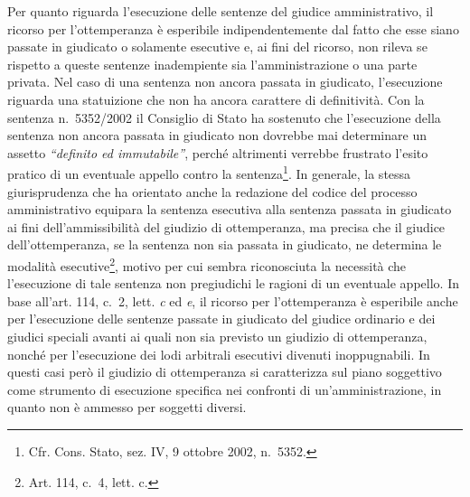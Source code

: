 \documentclass[12pt,it,a4paper,]{report}
\begin{document}
Per quanto riguarda l'esecuzione delle sentenze del giudice
amministrativo, il ricorso per l'ottemperanza è esperibile
indipendentemente dal fatto che esse siano passate in giudicato o
solamente esecutive e, ai fini del ricorso, non rileva se rispetto a
queste sentenze inadempiente sia l'amministrazione o una parte privata.
Nel caso di una sentenza non ancora passata in giudicato, l'esecuzione
riguarda una statuizione che non ha ancora carattere di definitività.
Con la sentenza n.~5352/2002 il Consiglio di Stato ha sostenuto che
l'esecuzione della sentenza non ancora passata in giudicato non dovrebbe
mai determinare un assetto \emph{``definito ed immutabile''}, perché
altrimenti verrebbe frustrato l'esito pratico di un eventuale appello
contro la sentenza\footnote{Cfr. Cons. Stato, sez. IV, 9 ottobre 2002,
  n.~5352.}. In generale, la stessa giurisprudenza che ha orientato
anche la redazione del codice del processo amministrativo equipara la
sentenza esecutiva alla sentenza passata in giudicato ai fini
dell'ammissibilità del giudizio di ottemperanza, ma precisa che il
giudice dell'ottemperanza, se la sentenza non sia passata in giudicato,
ne determina le modalità esecutive\footnote{Art. 114, c.~4, lett. c.},
motivo per cui sembra riconosciuta la necessità che l'esecuzione di tale
sentenza non pregiudichi le ragioni di un eventuale appello. In base
all'art. 114, c.~2, lett. \emph{c} ed \emph{e}, il ricorso per
l'ottemperanza è esperibile anche per l'esecuzione delle sentenze
passate in giudicato del giudice ordinario e dei giudici speciali avanti
ai quali non sia previsto un giudizio di ottemperanza, nonché per
l'esecuzione dei lodi arbitrali esecutivi divenuti inoppugnabili. In
questi casi però il giudizio di ottemperanza si caratterizza sul piano
soggettivo come strumento di esecuzione specifica nei confronti di
un'amministrazione, in quanto non è ammesso per soggetti diversi.
\end{document}
